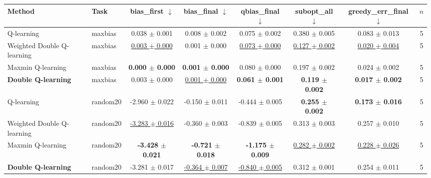 \begin{tabular}{llcccccc}
\toprule
Method & Task & bias\_first $\downarrow$ & bias\_final $\downarrow$ & qbias\_final $\downarrow$ & subopt\_all $\downarrow$ & greedy\_err\_final $\downarrow$ & $n$ \\
\midrule
Q-learning & maxbias & 0.038 $\pm$ 0.001 & 0.008 $\pm$ 0.002 & 0.075 $\pm$ 0.002 & 0.380 $\pm$ 0.005 & 0.083 $\pm$ 0.013 & 5 \\
Weighted Double Q-learning & maxbias & \underline{0.003 $\pm$ 0.000} & 0.001 $\pm$ 0.000 & \underline{0.073 $\pm$ 0.000} & \underline{0.127 $\pm$ 0.002} & \underline{0.020 $\pm$ 0.004} & 5 \\
Maxmin Q-learning & maxbias & \textbf{0.000 $\pm$ 0.000} & \textbf{0.001 $\pm$ 0.000} & 0.080 $\pm$ 0.000 & 0.197 $\pm$ 0.002 & 0.024 $\pm$ 0.002 & 5 \\
\textbf{Double Q-learning} & maxbias & 0.003 $\pm$ 0.000 & \underline{0.001 $\pm$ 0.000} & \textbf{0.061 $\pm$ 0.001} & \textbf{0.119 $\pm$ 0.002} & \textbf{0.017 $\pm$ 0.002} & 5 \\
\midrule
Q-learning & random20 & -2.960 $\pm$ 0.022 & -0.150 $\pm$ 0.011 & -0.444 $\pm$ 0.005 & \textbf{0.255 $\pm$ 0.002} & \textbf{0.173 $\pm$ 0.016} & 5 \\
Weighted Double Q-learning & random20 & \underline{-3.283 $\pm$ 0.016} & -0.360 $\pm$ 0.003 & -0.839 $\pm$ 0.005 & 0.313 $\pm$ 0.003 & 0.257 $\pm$ 0.010 & 5 \\
Maxmin Q-learning & random20 & \textbf{-3.428 $\pm$ 0.021} & \textbf{-0.721 $\pm$ 0.018} & \textbf{-1.175 $\pm$ 0.009} & \underline{0.282 $\pm$ 0.002} & \underline{0.228 $\pm$ 0.026} & 5 \\
\textbf{Double Q-learning} & random20 & -3.281 $\pm$ 0.017 & \underline{-0.364 $\pm$ 0.007} & \underline{-0.840 $\pm$ 0.005} & 0.312 $\pm$ 0.001 & 0.254 $\pm$ 0.011 & 5 \\
\bottomrule
\end{tabular}
